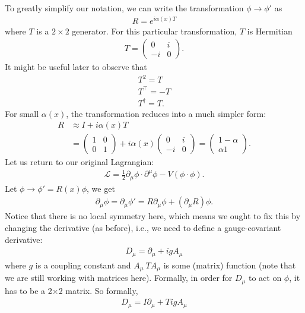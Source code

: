 \documentclass[a4paper,11pt]{article}
\numberwithin{equation}{section}
\theoremstyle{definition}
\newcommand{\p}{\partial}
\newcommand{\lag}{\mathcal{L}}
\begin{document}
To greatly simplify our notation, we can write the transformation $\phi \to \phi'$ as
\begin{align}
R = e^{i\alpha(x)T}
\end{align}
where $T$ is a $2\times 2$ generator. For this particular transformation, $T$ is Hermitian 
\begin{align}
T = \begin{pmatrix}
0 & i\\
-i & 0
\end{pmatrix}.
\end{align}
It might be useful later to observe that
\begin{align}
T^2 = T\\T^\top = -T \\ T^{\dagger} = T.
\end{align}
For small $\alpha(x)$, the transformation reduces into a much simpler form:
\begin{align}
R &\approx I + i\alpha(x)T\\
&= \begin{pmatrix}
1&0\\0&1
\end{pmatrix} + i\alpha(x)\begin{pmatrix}
0 & i\\-i&0
\end{pmatrix} = 
\begin{pmatrix}
1 -\alpha\\\alpha 1
\end{pmatrix}.
\end{align}
Let us return to our original Lagrangian:
\begin{align}
\lag = \frac{1}{2}\p_\mu\phi \cdot \p^\mu\phi - V(\phi\cdot \phi).
\end{align}
Let $\phi \to \phi' = R(x)\phi$, we get 
\begin{align}
\p_\mu\phi = \p_\mu\phi' = R\p_\mu\phi + (\p_\mu R)\phi.
\end{align}
Notice that there is no local symmetry here, which means we ought to fix this by changing the derivative (as before), i.e., we need to define a gauge-covariant derivative:
\begin{align}
D_\mu = \p_\mu + igA_\mu
\end{align}
where $g$ is a coupling constant and $A_\mu ~ TA_\mu$ is some (matrix) function (note that we are still working with matrices here). Formally, in order for $D_\mu$ to act on $\phi$, it has to be a 2$\times $2 matrix. So formally,
\begin{align}
\boxed{D_\mu = I\p_\mu + TigA_\mu}
\end{align} 
\end{document}
